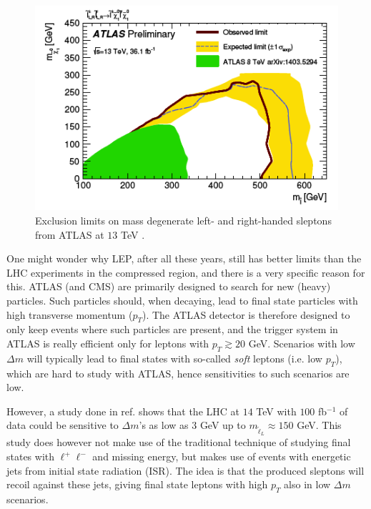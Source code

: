 \documentclass[twocolumn,a4paper,10pt]{article}
\begin{document}
\begin{figure}
\begin{center}
\includegraphics[scale=0.5]{Run2exclusion_new.png}
\caption{Exclusion limits on mass degenerate left- and right-handed sleptons from ATLAS at $13$ TeV 
\cite{ATLAS:2017}.}
\label{fig:ATLAS 13TeV}
\end{center}
\end{figure}

One might wonder why LEP, after all these years, still has better limits than the LHC experiments in the 
compressed region, and there is a very specific reason for this. ATLAS (and CMS) are primarily designed 
to search for new (heavy) particles. Such particles should, when decaying, lead to final state particles 
with high transverse momentum ($p_T$). The ATLAS detector is therefore designed to only keep events where 
such particles are present, and the trigger system \cite{ATLAS triggers} in ATLAS is really efficient 
only for leptons with $p_T \gtrsim 20$ GeV. Scenarios with low $\Delta m$ will typically lead to final 
states with so-called \textit{soft} leptons (i.e. low $p_T$), which are hard to study with ATLAS, hence 
sensitivities to such scenarios are low. 

However, a study done in ref. \cite{Compressed sleptons} shows that the LHC at $14$ TeV with $100$ 
fb$^{-1}$ of data could be sensitive to $\Delta m$'s as low as $3$ GeV up to 
$m_{\tilde{\ell}_L} \approx 150$ GeV. This study does however not make use of the traditional 
technique of studying final states with $\ell^+ \ell^-$ and missing energy, but makes use of events with 
energetic jets from initial state radiation (ISR). The idea is that the produced sleptons will recoil 
against these jets, giving final state leptons with high $p_T$ also in low $\Delta m$ scenarios.        
\end{document}
